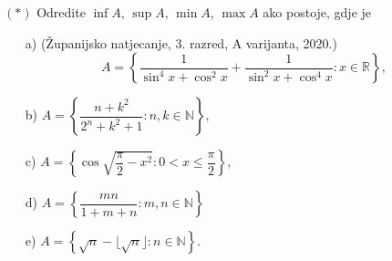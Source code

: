 \begin{exercise} $(*)$
Odredite $\inf{A}$, $\sup{A}$, $\min{A}$, $\max{A}$ ako postoje, gdje je
\begin{itemize}
\item[a)] (Županijsko natjecanje, 3. razred, A varijanta, 2020.) $$A=\left\{\dfrac{1}{\sin^4{x}+\cos^2{x}}+\dfrac{1}{\sin^2{x}+\cos^4{x}} : x\in \mathbb{R}\right\},$$
\item[b)]
$A=\left\{\dfrac{n+k^2}{2^n+k^2+1} : n, k\in \mathbb{N}\right\},$
\item[c)] $A=\left\{\cos{\sqrt{\dfrac{\pi}{2}-x^2}} : 0<x\leq \dfrac{\pi}{2}\right\}$,
\item[d)] $A=\left\{\dfrac{mn}{1+m+n} : m, n\in \mathbb{N}\right\}$
\item[e)] $A=\left\{\sqrt{n}-\lfloor \sqrt{n}\rfloor : n\in \mathbb{N}\right\}$.
\end{itemize}

\end{exercise}
